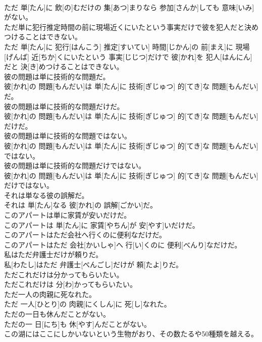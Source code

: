 \documentclass[8pt]{extreport}
\begin{document}
\begin{CJK}{UTF8}{min}
\\	ただ 単[たん]に 飲[の]むだけの 集[あつ]まりなら 参加[さんか]しても 意味[いみ]がない。
\\	ただ単に犯行推定時間の前に現場近くにいたという事実だけで彼を犯人だと決めつけることはできない。	
\\	ただ 単[たん]に 犯行[はんこう] 推定[すいてい] 時間[じかん]の 前[まえ]に 現場[げんば] 近[ちか]くにいたという 事実[じじつ]だけで 彼[かれ]を 犯人[はんにん]だと 決[き]めつけることはできない。
\\	彼の問題は単に技術的な問題だ。	
\\	彼[かれ]の 問題[もんだい]は 単[たん]に 技術[ぎじゅつ] 的[てき]な 問題[もんだい]だ。
\\	彼の問題は単に技術的な問題だけだ。	
\\	彼[かれ]の 問題[もんだい]は 単[たん]に 技術[ぎじゅつ] 的[てき]な 問題[もんだい]だけだ。
\\	彼の問題は単に技術的な問題ではない。	
\\	彼[かれ]の 問題[もんだい]は 単[たん]に 技術[ぎじゅつ] 的[てき]な 問題[もんだい]ではない。
\\	彼の問題は単に技術的な問題だけではない。	
\\	彼[かれ]の 問題[もんだい]は 単[たん]に 技術[ぎじゅつ] 的[てき]な 問題[もんだい]だけではない。
\\	それは単なる彼の誤解だ。	
\\	それは 単[たん]なる 彼[かれ]の 誤解[ごかい]だ。
\\	このアパートは単に家賃が安いだけだ。	
\\	このアパートは 単[たん]に 家賃[やちん]が 安[やす]いだけだ。
\\	このアパートはただ会社へ行くのに便利なだけだ。	
\\	このアパートはただ 会社[かいしゃ]へ 行[い]くのに 便利[べんり]なだけだ。
\\	私はただ弁護士だけが頼りだ。	
\\	私[わたし]はただ 弁護士[べんごし]だけが 頼[たよ]りだ。
\\	ただこれだけは分かってもらいたい。	
\\	ただこれだけは 分[わ]かってもらいたい。
\\	ただ一人の肉親に死なれた。	
\\	ただ 一人[ひとり]の 肉親[にくしん]に 死[し]なれた。
\\	ただの一日も休んだことがない。	
\\	ただの一 日[にち]も 休[やす]んだことがない。
\\	この湖にはここにしかいないという生物がおり、その数たるや50種類を越える。	

\end{CJK}
\end{document}
